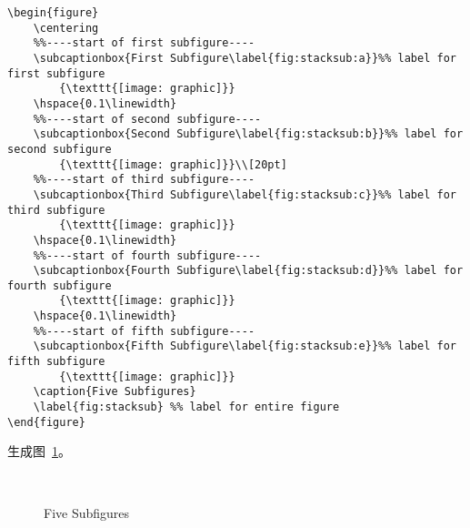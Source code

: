 \begin{lstlisting}
\begin{figure}
	\centering
	%%----start of first subfigure----
	\subcaptionbox{First Subfigure\label{fig:stacksub:a}}%% label for first subfigure
		{\texttt{[image: graphic]}}
	\hspace{0.1\linewidth}
	%%----start of second subfigure----
	\subcaptionbox{Second Subfigure\label{fig:stacksub:b}}%% label for second subfigure
		{\texttt{[image: graphic]}}\\[20pt]
	%%----start of third subfigure----
	\subcaptionbox{Third Subfigure\label{fig:stacksub:c}}%% label for third subfigure
		{\texttt{[image: graphic]}}
	\hspace{0.1\linewidth}
	%%----start of fourth subfigure----
	\subcaptionbox{Fourth Subfigure\label{fig:stacksub:d}}%% label for fourth subfigure
		{\texttt{[image: graphic]}}
	\hspace{0.1\linewidth}
	%%----start of fifth subfigure----
	\subcaptionbox{Fifth Subfigure\label{fig:stacksub:e}}%% label for fifth subfigure
		{\texttt{[image: graphic]}}
	\caption{Five Subfigures}
	\label{fig:stacksub} %% label for entire figure
\end{figure}
\end{lstlisting}
生成图~\ref{fig:stacksub}。

\begin{figure}
	\centering
		{\resizebox{0.25\linewidth}{!}{\usebox{\boxgraphic}}}
	\hspace{0.1\linewidth}
		{\resizebox{0.25\linewidth}{!}{\usebox{\boxgraphic}}}\\[20pt]
		{\resizebox{0.25\linewidth}{!}{\usebox{\boxgraphic}}}
	\hspace{0.1\linewidth}
		{\resizebox{0.25\linewidth}{!}{\usebox{\boxgraphic}}}
	\hspace{0.1\linewidth}
		{\resizebox{0.25\linewidth}{!}{\usebox{\boxgraphic}}}
	\caption{Five Subfigures}
	\label{fig:stacksub} %
\end{figure}

